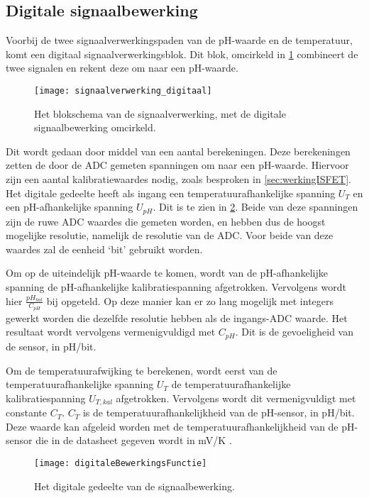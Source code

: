 \subsection{Digitale signaalbewerking}\label{sec:digitaal}

Voorbij de twee signaalverwerkingspaden van de pH-waarde en de temperatuur, komt een digitaal signaalverwerkingsblok. Dit blok, omcirkeld in \cref{fig:digitaalInSchema}  combineert de twee signalen en rekent deze om naar een pH-waarde.
\begin{figure}[!htb]
    \centering
    \texttt{[image: signaalverwerking\_digitaal]}
    \caption{Het blokschema van de signaalverwerking, met de digitale signaalbewerking omcirkeld.}
    \label{fig:digitaalInSchema}
\end{figure}

Dit wordt gedaan door middel van een aantal berekeningen. Deze berekeningen zetten de door de ADC gemeten spanningen om naar een pH-waarde. Hiervoor zijn een aantal kalibratiewaardes nodig, zoals besproken in \cref{sec:werkingISFET}. Het digitale gedeelte heeft als ingang een temperatuurafhankelijke spanning $U_T$ en een pH-afhankelijke spanning $U_{pH}$. Dit is te zien in \cref{fig:digitaleBewerkingsFunctie}. Beide van deze spanningen zijn de ruwe ADC waardes die gemeten worden, en hebben dus de hoogst mogelijke resolutie, namelijk de resolutie van de ADC. Voor beide van deze waardes zal de eenheid `bit' gebruikt worden.

Om op de uiteindelijk pH-waarde te komen, wordt van de pH-afhankelijke spanning de pH-afhankelijke kalibratiespanning afgetrokken. Vervolgens wordt hier $\frac{pH_{kal}}{C_{pH}}$ bij opgeteld. Op deze manier kan er zo lang mogelijk met integers gewerkt worden die dezelfde resolutie hebben als de ingangs-ADC waarde. Het resultaat wordt vervolgens vermenigvuldigd met $C_{pH}$. Dit is de gevoeligheid van de sensor, in pH/bit.

Om de temperatuurafwijking te berekenen, wordt eerst van de temperatuurafhankelijke spanning $U_T$ de temperatuurafhankelijke kalibratiespanning $U_{T,kal}$ afgetrokken. Vervolgens wordt dit vermenigvuldigt met constante $C_T$. $C_T$ is de temperatuurafhankelijkheid van de pH-sensor, in pH/bit. Deze waarde kan afgeleid worden met de temperatuurafhankelijkheid van de pH-sensor die in de datasheet gegeven wordt in mV/K \cite{isfet}.

\begin{figure}[!htb]
    \centering
    \texttt{[image: digitaleBewerkingsFunctie]}
    \caption{Het digitale gedeelte van de signaalbewerking.}
    \label{fig:digitaleBewerkingsFunctie}
\end{figure}
